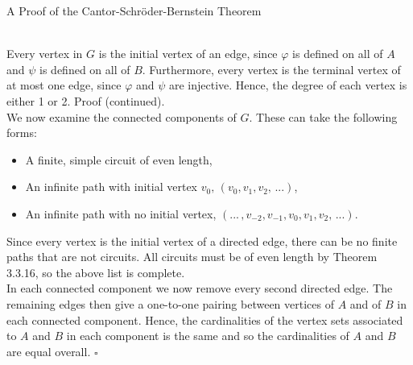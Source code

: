 \documentclass[smaller,hyperref={CJKbookmarks=true}]{beamer}
\newenvironment{PROOF}{{\noindent\!\sf\alert{Proof.}}\\}{\hfill$\square$\\}
\begin{document}
\begin{frame}{A Proof of the Cantor-Schr\"{o}der-Bernstein Theorem}
\begin{spacing}{1}
\begin{PROOF}
Every vertex in $G$ is the initial vertex of an edge, since $\varphi$ is defined on all of $A$ and $\psi$ is defined on all of $B$. Furthermore, every vertex is the terminal vertex of at most one edge, since $\varphi$ and $\psi$ are injective. Hence, the degree of each vertex is either 1 or 2.
\newpage
\alert{Proof (continued).}\\
We now examine the connected components of $G$. These can take the
following forms:
\begin{itemize}
  \item A finite, simple circuit of even length,
  \item An infinite path with initial vertex $v_0,\,(v_0,v_1,v_2,\,...)$,
  \item An infinite path with no initial vertex, $(...\,,v_{-2},v_{-1},v_0,v_1,v_2,\,...)$.
\end{itemize}
Since every vertex is the initial vertex of a directed edge, there can be no
finite paths that are not circuits. All circuits must be of even length by
Theorem 3.3.16, so the above list is complete.\\[7pt]
In each connected component we now remove every second directed edge.
The remaining edges then give a one-to-one pairing between vertices of $A$
and of $B$ in each connected component. Hence, the cardinalities of the
vertex sets associated to $A$ and $B$ in each component is the same and so
the cardinalities of $A$ and $B$ are equal overall.
\end{PROOF}
\end{spacing}
\end{frame}
\end{document}
